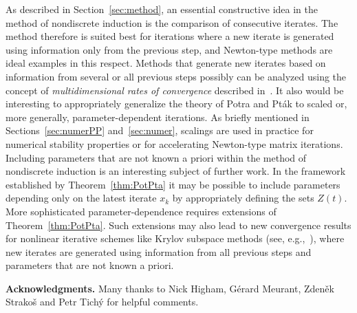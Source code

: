 \documentclass{siamltex}
\begin{document}
As described in Section~\ref{sec:method}, an essential constructive idea in the method
of nondiscrete induction is the comparison of consecutive iterates. The method
therefore is suited best for iterations where a new iterate is generated using information
only from the previous step, and Newton-type methods
are ideal examples in this respect. Methods that generate new iterates based on
information from several or all previous steps possibly can be analyzed using the concept of
{\em multidimensional rates of convergence} described in~\cite[Chapter~3]{PotPtaBook84}.
It also would be interesting to appropriately generalize the theory of Potra and Pt\'ak to
scaled or, more generally, parameter-dependent iterations. As briefly mentioned in
Sections~\ref{sec:numerPP} and~\ref{sec:numer}, scalings are used in practice for
numerical stability properties or for accelerating 
Newton-type matrix iterations. Including parameters
that are not known a priori within the method of nondiscrete induction is an interesting
subject of further work. In the framework established by Theorem~\ref{thm:PotPta} it may
be possible to include parameters depending only on the latest iterate $x_k$ by appropriately
defining the sets $Z(t)$. More sophisticated parameter-dependence requires extensions of
Theorem~\ref{thm:PotPta}. Such extensions may also lead to new convergence results for
nonlinear iterative schemes like Krylov subspace methods (see, e.g.,~\cite{LieStrBook13}),
where new iterates are generated using information from all previous steps and parameters
that are not known a priori.

\medskip
{\bf Acknowledgments.} Many thanks to Nick Higham, G{\'e}rard Meurant,
Zden{\v e}k Strako{\v s} and Petr Tich\'y for helpful comments.
\end{document}

